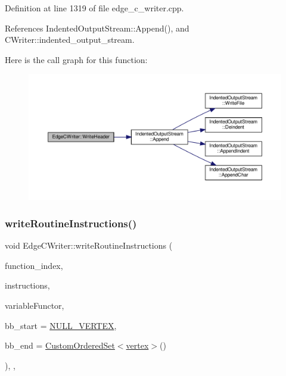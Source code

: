 Definition at line 1319 of file edge\+\_\+c\+\_\+writer.\+cpp.



References Indented\+Output\+Stream\+::\+Append(), and C\+Writer\+::indented\+\_\+output\+\_\+stream.

Here is the call graph for this function\+:
\nopagebreak
\begin{figure}[H]
\begin{center}
\leavevmode
\includegraphics[width=350pt]{d7/dee/classEdgeCWriter_a8b053256b8c65aca7d7539ebd23537c8_cgraph}
\end{center}
\end{figure}
\mbox{\label{classEdgeCWriter_a26e88f61025b2993b8608ef28951cb9f}} 
\subsubsection{\texorpdfstring{write\+Routine\+Instructions()}{writeRoutineInstructions()}}
{\footnotesize\ttfamily void Edge\+C\+Writer\+::write\+Routine\+Instructions (\begin{DoxyParamCaption}\item[{const unsigned int}]{function\+\_\+index,  }\item[{const \hyperlink{classOpVertexSet}{Op\+Vertex\+Set} \&}]{instructions,  }\item[{const \hyperlink{var__pp__functor_8hpp_a8a6b51b6519401d911398943510557f0}{var\+\_\+pp\+\_\+functor\+Const\+Ref}}]{variable\+Functor,  }\item[{\hyperlink{graph_8hpp_abefdcf0544e601805af44eca032cca14}{vertex}}]{bb\+\_\+start = {\ttfamily \hyperlink{graph_8hpp_ac3c33c45c396860b76e8aff4dd2b8158}{N\+U\+L\+L\+\_\+\+V\+E\+R\+T\+EX}},  }\item[{\hyperlink{classCustomOrderedSet}{Custom\+Ordered\+Set}$<$ \hyperlink{graph_8hpp_abefdcf0544e601805af44eca032cca14}{vertex} $>$}]{bb\+\_\+end = {\ttfamily \hyperlink{classCustomOrderedSet}{Custom\+Ordered\+Set}$<$\hyperlink{graph_8hpp_abefdcf0544e601805af44eca032cca14}{vertex}$>$()} }\end{DoxyParamCaption})\hspace{0.3cm}{\ttfamily [override]}, {\ttfamily [protected]}, {\ttfamily [virtual]}}



